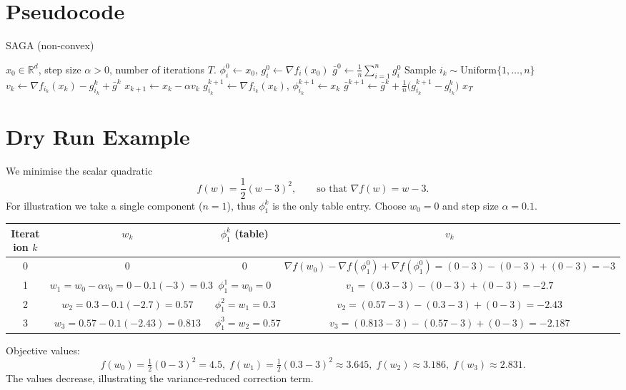\documentclass{article}
\newcommand{\R}{\mathbb{R}}
\begin{document}
\section*{Pseudocode}
\begin{algorithm}[H]
\caption{SAGA (non‑convex)}\label{alg:saga}
\begin{algorithmic}[1]
\REQUIRE $x_0\in\R^{d}$, step size $\alpha>0$, number of iterations $T$.
    \STATE $\phi_i^0\gets x_0$, \; $g_i^0\gets \nabla f_i(x_0)$
\ENDFOR
\STATE $\bar g^0 \gets \frac1n\sum_{i=1}^{n} g_i^0$ 
    \STATE Sample $i_k\sim\text{Uniform}\{1,\dots,n\}$
    \STATE $v_k \gets \nabla f_{i_k}(x_k)-g_{i_k}^k+\bar g^k$
    \STATE $x_{k+1}\gets x_k-\alpha v_k$
    \STATE $g_{i_k}^{k+1}\gets \nabla f_{i_k}(x_k)$,\;
          $\phi_{i_k}^{k+1}\gets x_k$
    \STATE $\bar g^{k+1}\gets \bar g^{k}+\frac{1}{n}\bigl(g_{i_k}^{k+1}-g_{i_k}^{k}\bigr)$
\ENDFOR
\RETURN $x_T$
\end{algorithmic}
\end{algorithm}

\section*{Dry Run Example}
We minimise the scalar quadratic  
\[
f(w)=\frac12(w-3)^2,
\qquad\text{so that } \nabla f(w)=w-3.
\]
For illustration we take a single component ($n=1$), thus $\phi_1^k$ is the only table entry.
Choose $w_0=0$ and step size $\alpha=0.1$.

\begin{center}
\begin{tabular}{c|c|c|c}
Iteration $k$ & $w_k$ & $\phi_1^k$ (table) & $v_k$ \\\hline
0 & $0$ & $0$ & $\nabla f(w_0)-\nabla f(\phi_1^0)+\nabla f(\phi_1^0)= (0-3)- (0-3)+(0-3)=-3$ \\
1 & $w_1=w_0-\alpha v_0=0-0.1(-3)=0.3$ & $\phi_1^1=w_0=0$ & $v_1=(0.3-3)-(0-3)+(0-3)=-2.7$ \\
2 & $w_2=0.3-0.1(-2.7)=0.57$ & $\phi_1^2=w_1=0.3$ & $v_2=(0.57-3)-(0.3-3)+(0-3)=-2.43$ \\
3 & $w_3=0.57-0.1(-2.43)=0.813$ & $\phi_1^3=w_2=0.57$ & $v_3=(0.813-3)-(0.57-3)+(0-3)=-2.187$
\end{tabular}
\end{center}
Objective values:
\[
f(w_0)=\tfrac12(0-3)^2=4.5,\;
f(w_1)=\tfrac12(0.3-3)^2\approx3.645,\;
f(w_2)\approx3.186,\;
f(w_3)\approx2.831.
\]
The values decrease, illustrating the variance‑reduced correction term.
\end{document}
